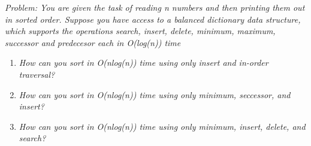 \emph{Problem: You are given the task of reading n numbers and then printing them out in sorted order. Suppose you have access to a balanced dictionary data structure, which supports the operations search, insert, delete, minimum, maximum, successor and predecesor each in O(log(n)) time}\\

\begin{enumerate}
	\item \emph{How can you sort in O(nlog(n)) time using only insert and in-order traversal?}
	\item \emph{How can you sort in O(nlog(n)) time using only minimum, seccessor, and insert?}
	\item \emph{How can you sort in O(nlog(n)) time using only minimum, insert, delete, and search?}
\end{enumerate}